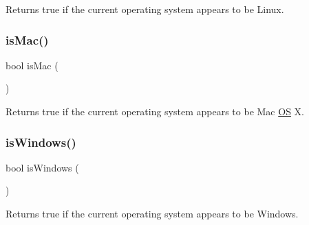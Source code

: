 Returns true if the current operating system appears to be Linux. 

\mbox{\label{classOS_a78ccfa2165be4fedb1caa2aca444568c}} 
\subsubsection{\texorpdfstring{is\+Mac()}{isMac()}}
{\footnotesize\ttfamily bool is\+Mac (\begin{DoxyParamCaption}{ }\end{DoxyParamCaption})\hspace{0.3cm}{\ttfamily [static]}}



Returns true if the current operating system appears to be Mac \mbox{\hyperlink{classOS}{OS}} X. 

\mbox{\label{classOS_a98203f29153132a6da56b0ff5634bdb3}} 
\subsubsection{\texorpdfstring{is\+Windows()}{isWindows()}}
{\footnotesize\ttfamily bool is\+Windows (\begin{DoxyParamCaption}{ }\end{DoxyParamCaption})\hspace{0.3cm}{\ttfamily [static]}}



Returns true if the current operating system appears to be Windows. 

